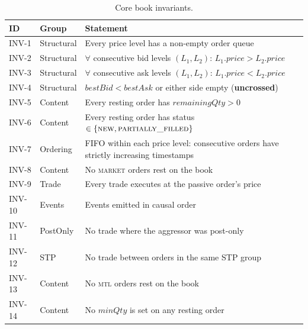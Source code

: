 \documentclass[11pt,a4paper]{article}
\begin{document}
\begin{table}[H]
\centering
\caption{Core book invariants.}
\label{tab:inv-summary}
\small
\begin{tabular}{@{}llL{7cm}@{}}
\toprule
ID & Group & Statement \\
\midrule
INV-1   & Structural & Every price level has a non-empty order queue \\
INV-2   & Structural & $\forall$ consecutive bid levels $(L_1,L_2)$: $L_1.\mathit{price} > L_2.\mathit{price}$ \\
INV-3   & Structural & $\forall$ consecutive ask levels $(L_1,L_2)$: $L_1.\mathit{price} < L_2.\mathit{price}$ \\
INV-4   & Structural & $\mathit{bestBid} < \mathit{bestAsk}$ or either side empty (\textbf{uncrossed}) \\
INV-5   & Content    & Every resting order has $\mathit{remainingQty} > 0$ \\
INV-6   & Content    & Every resting order has status $\in\{\textsc{new},\textsc{partially\_filled}\}$ \\
INV-7   & Ordering   & FIFO within each price level: consecutive orders have strictly increasing timestamps \\
INV-8   & Content    & No \textsc{market} orders rest on the book \\
INV-9   & Trade      & Every trade executes at the passive order's price \\
INV-10  & Events     & Events emitted in causal order \\
INV-11  & PostOnly   & No trade where the aggressor was post-only \\
INV-12  & STP        & No trade between orders in the same STP group \\
INV-13  & Content    & No \textsc{mtl} orders rest on the book \\
INV-14  & Content    & No $\mathit{minQty}$ is set on any resting order \\
\bottomrule
\end{tabular}
\end{table}
\end{document}
